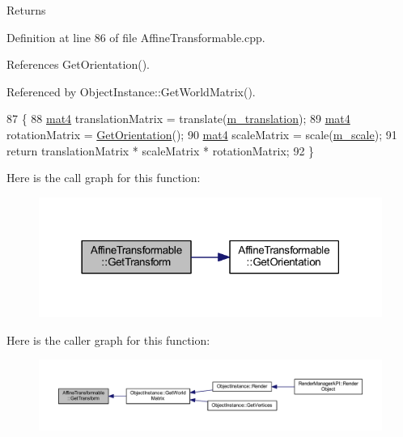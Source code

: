 \begin{DoxyReturn}{Returns}

\end{DoxyReturn}


Definition at line 86 of file Affine\+Transformable.\+cpp.



References Get\+Orientation().



Referenced by Object\+Instance\+::\+Get\+World\+Matrix().


\begin{DoxyCode}
87 \{
88   \hyperlink{_types_8h_a2db59f395fe82a7394c6324956c265d8}{mat4} translationMatrix = translate(\hyperlink{class_affine_transformable_a3573983127e380c3d9151c32b43d199d}{m\_translation});
89   \hyperlink{_types_8h_a2db59f395fe82a7394c6324956c265d8}{mat4} rotationMatrix = \hyperlink{class_affine_transformable_a891419484ac01da747f832e5a84e8e37}{GetOrientation}();
90   \hyperlink{_types_8h_a2db59f395fe82a7394c6324956c265d8}{mat4} scaleMatrix = scale(\hyperlink{class_affine_transformable_ac332af15336f089337fd31d7b3996bad}{m\_scale});
91   \textcolor{keywordflow}{return} translationMatrix * scaleMatrix * rotationMatrix;
92 \}
\end{DoxyCode}


Here is the call graph for this function\+:\nopagebreak
\begin{figure}[H]
\begin{center}
\leavevmode
\includegraphics[width=318pt]{class_affine_transformable_a3eb990ab0b75ad30d3bb667e437d8606_cgraph}
\end{center}
\end{figure}




Here is the caller graph for this function\+:
\nopagebreak
\begin{figure}[H]
\begin{center}
\leavevmode
\includegraphics[width=350pt]{class_affine_transformable_a3eb990ab0b75ad30d3bb667e437d8606_icgraph}
\end{center}
\end{figure}


